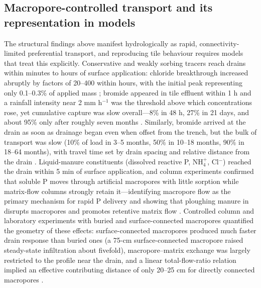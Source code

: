 \documentclass[11pt]{article}
\begin{document}
\subsection{Macropore-controlled transport and its representation in models}

The structural findings above manifest hydrologically as rapid, connectivity-limited
preferential transport, and reproducing tile behaviour requires models that treat this
explicitly. Conservative and weakly sorbing tracers reach drains within minutes to
hours of surface application: chloride breakthrough increased abruptly by factors of
20--400 within hours, with the initial peak representing only 0.1--0.3\% of applied
mass \parencite{Villholth1998}; bromide appeared in tile effluent within 1 h and a
rainfall intensity near 2 mm h$^{-1}$ was the threshold above which concentrations
rose, yet cumulative capture was slow overall---8\% in 48 h, 27\% in 21 days, and
about 95\% only after roughly seven months \parencite{Frey2012}. Similarly, bromide
arrived at the drain as soon as drainage began even when offset from the trench, but
the bulk of transport was slow (10\% of load in 3--5 months, 50\% in 10--18 months,
90\% in 18--64 months), with travel time set by drain spacing and relative distance
from the drain \parencite{Kladivko2023}. Liquid-manure constituents (dissolved
reactive P, NH$_4^+$, Cl$^-$) reached the drain within 5 min of surface application,
and column experiments confirmed that soluble P moves through artificial macropores
with little sorption while matrix-flow columns strongly retain it---identifying
macropore flow as the primary mechanism for rapid P delivery and showing that ploughing
manure in disrupts macropores and promotes retentive matrix flow
\parencite{Stamm2002,Geohring2001}. Controlled column and laboratory experiments with
buried and surface-connected macropores quantified the geometry of these effects:
surface-connected macropores produced much faster drain response than buried ones (a
75-cm surface-connected macropore raised steady-state infiltration about fivefold),
macropore--matrix exchange was largely restricted to the profile near the drain, and
a linear total-flow-ratio relation implied an effective contributing distance of only
20--25 cm for directly connected macropores \parencite{Akay2007,Akay2008}.
\end{document}
